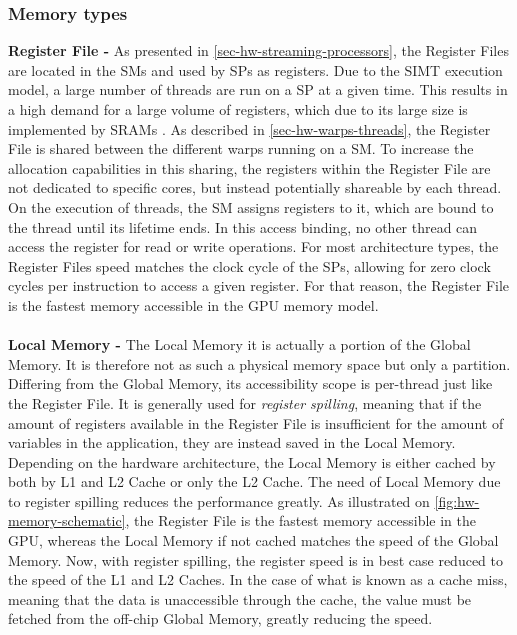 \subsubsection{Memory types}
\label{sec-mem-types}
\textbf{Register File -} As presented in \cref{sec-hw-streaming-processors}, the Register Files are located in the SMs and used by SPs as registers.
Due to the SIMT execution model, a large number of threads are run on a SP at a given time.
This results in a high demand for a large volume of registers, which due to its large size is implemented by SRAMs \cite{Li2016}.
As described in \cref{sec-hw-warps-threads}, the Register File is shared between the different warps running on a SM.
To increase the allocation capabilities in this sharing, the registers within the Register File are not dedicated to specific cores, but instead potentially shareable by each thread.
On the execution of threads, the SM assigns registers to it, which are bound to the thread until its lifetime ends.
In this access binding, no other thread can access the register for read or write operations.
For most architecture types, the Register Files speed matches the clock cycle of the SPs, allowing for zero clock cycles per instruction to access a given register.
For that reason, the Register File is the fastest memory accessible in the GPU memory model.
\\\\
\textbf{Local Memory -} The Local Memory it is actually a portion of the Global Memory.
It is therefore not as such a physical memory space but only a partition.
Differing from the Global Memory, its accessibility scope is per-thread just like the Register File.
It is generally used for \textit{register spilling}, meaning that if the amount of registers available in the Register File is insufficient for the amount of variables in the application, they are instead saved in the Local Memory.
Depending on the hardware architecture, the Local Memory is either cached by both by L1 and L2 Cache or only the L2 Cache.
The need of Local Memory due to register spilling reduces the performance greatly.
As illustrated on \cref{fig:hw-memory-schematic}, the Register File is the fastest memory accessible in the GPU, whereas the Local Memory if not cached matches the speed of the Global Memory. 
Now, with register spilling, the register speed is in best case reduced to the speed of the L1 and L2 Caches.
In the case of what is known as a cache miss, meaning that the data is unaccessible through the cache, the value must be fetched from the off-chip Global Memory, greatly reducing the speed.
